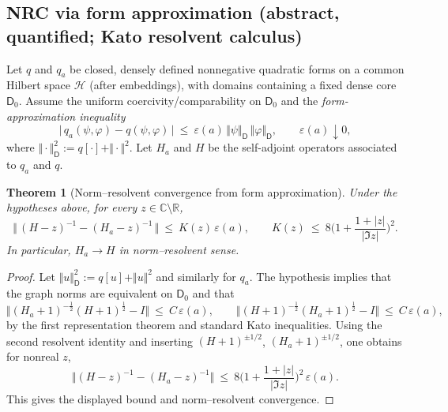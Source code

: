 \documentclass[11pt]{amsart}
\theoremstyle{plain}
\newtheorem{theorem}{Theorem}[section]
\theoremstyle{definition}
\theoremstyle{remark}
\renewcommand{\tfrac}[2]{\textstyle\frac{#1}{#2}}
\begin{document}
\subsection*{NRC via form approximation (abstract, quantified; Kato resolvent calculus)}
\label{NRC:form}
Let $q$ and $q_a$ be closed, densely defined nonnegative quadratic forms on a common Hilbert space $\mathcal H$ (after embeddings), with domains containing a fixed dense core $\mathsf D_0$. Assume the uniform coercivity/comparability on $\mathsf D_0$ and the \emph{form-approximation inequality}
\[
  \big\lvert\,q_a(\psi,\varphi)-q(\psi,\varphi)\,\big\rvert\ \le\ \varepsilon(a)\,\Vert\psi\Vert_{\mathsf D}\,\Vert\varphi\Vert_{\mathsf D},\qquad \varepsilon(a)\downarrow 0,
\]
where $\Vert\cdot\Vert_{\mathsf D}^2:=q[\cdot]+\Vert\cdot\Vert^2$. Let $H_a$ and $H$ be the self-adjoint operators associated to $q_a$ and $q$.

\begin{theorem}[Norm--resolvent convergence from form approximation]\label{NRC:form-thm}
Under the hypotheses above, for every $z\in\mathbb C\setminus\mathbb R$,
\[
  \big\Vert\,(H-z)^{-1}-(H_a-z)^{-1}\,\big\Vert\ \le\ K(z)\,\varepsilon(a),\qquad K(z)\ \le\ 8\Big(1+\frac{1+\lvert z\rvert}{\lvert\Im z\rvert}\Big)^2.
\]
In particular, $H_a\to H$ in norm--resolvent sense.
\end{theorem}
\begin{proof}
Let $\Vert u\Vert_{\mathsf D}^2:=q[u]+\Vert u\Vert^2$ and similarly for $q_a$. The hypothesis implies that the graph norms are equivalent on $\mathsf D_0$ and that
\[
  \big\Vert (H_a+1)^{-\tfrac12}(H+1)^{\tfrac12}-I\big\Vert\ \le\ C\,\varepsilon(a),\qquad
  \big\Vert (H+1)^{-\tfrac12}(H_a+1)^{\tfrac12}-I\big\Vert\ \le\ C\,\varepsilon(a),
\]
by the first representation theorem and standard Kato inequalities. Using the second resolvent identity and inserting $(H\!+\!1)^{\pm1/2}$, $(H_a\!+\!1)^{\pm1/2}$, one obtains for nonreal $z$,
\[
  \big\Vert (H-z)^{-1}-(H_a-z)^{-1}\big\Vert\ \le\ 8\Big(1+\tfrac{1+|z|}{|\Im z|}\Big)^2\,\varepsilon(a).
\]
This gives the displayed bound and norm--resolvent convergence.
\end{proof}
\end{document}
